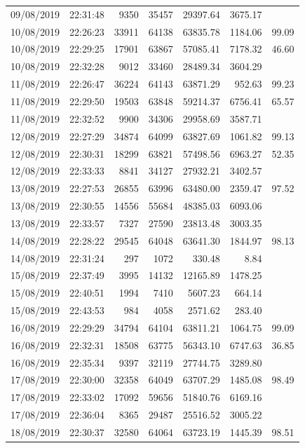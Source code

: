 \begin{longtable}{llrrrrr}
09/08/2019 & 22:31:48 & 9350 & 35457 & 29397.64 & 3675.17 &  \\
10/08/2019 & 22:26:23 & 33911 & 64138 & 63835.78 & 1184.06 & 99.09 \\
10/08/2019 & 22:29:25 & 17901 & 63867 & 57085.41 & 7178.32 & 46.60 \\
10/08/2019 & 22:32:28 & 9012 & 33460 & 28489.34 & 3604.29 &  \\
11/08/2019 & 22:26:47 & 36224 & 64143 & 63871.29 & 952.63 & 99.23 \\
11/08/2019 & 22:29:50 & 19503 & 63848 & 59214.37 & 6756.41 & 65.57 \\
11/08/2019 & 22:32:52 & 9900 & 34306 & 29958.69 & 3587.71 &  \\
12/08/2019 & 22:27:29 & 34874 & 64099 & 63827.69 & 1061.82 & 99.13 \\
12/08/2019 & 22:30:31 & 18299 & 63821 & 57498.56 & 6963.27 & 52.35 \\
12/08/2019 & 22:33:33 & 8841 & 34127 & 27932.21 & 3402.57 &  \\
13/08/2019 & 22:27:53 & 26855 & 63996 & 63480.00 & 2359.47 & 97.52 \\
13/08/2019 & 22:30:55 & 14556 & 55684 & 48385.03 & 6093.06 &  \\
13/08/2019 & 22:33:57 & 7327 & 27590 & 23813.48 & 3003.35 &  \\
14/08/2019 & 22:28:22 & 29545 & 64048 & 63641.30 & 1844.97 & 98.13 \\
14/08/2019 & 22:31:24 & 297 & 1072 & 330.48 & 8.84 &  \\
15/08/2019 & 22:37:49 & 3995 & 14132 & 12165.89 & 1478.25 &  \\
15/08/2019 & 22:40:51 & 1994 & 7410 & 5607.23 & 664.14 &  \\
15/08/2019 & 22:43:53 & 984 & 4058 & 2571.62 & 283.40 &  \\
16/08/2019 & 22:29:29 & 34794 & 64104 & 63811.21 & 1064.75 & 99.09 \\
16/08/2019 & 22:32:31 & 18508 & 63775 & 56343.10 & 6747.63 & 36.85 \\
16/08/2019 & 22:35:34 & 9397 & 32119 & 27744.75 & 3289.80 &  \\
17/08/2019 & 22:30:00 & 32358 & 64049 & 63707.29 & 1485.08 & 98.49 \\
17/08/2019 & 22:33:02 & 17092 & 59656 & 51840.76 & 6169.16 &  \\
17/08/2019 & 22:36:04 & 8365 & 29487 & 25516.52 & 3005.22 &  \\
18/08/2019 & 22:30:37 & 32580 & 64064 & 63723.19 & 1445.39 & 98.51 \\

\end{longtable}
